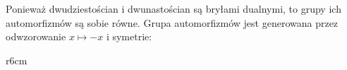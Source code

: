 
Ponieważ dwudziestościan i dwunastościan są bryłami dualnymi, to grupy ich automorfizmów są sobie równe. Grupa automorfizmów jest generowana przez odwzorowanie $x\mapsto -x$ i symetrie:

\begin{wrapfigure}{r}{6cm}
\begin{center}
\end{center}
\end{wrapfigure}
